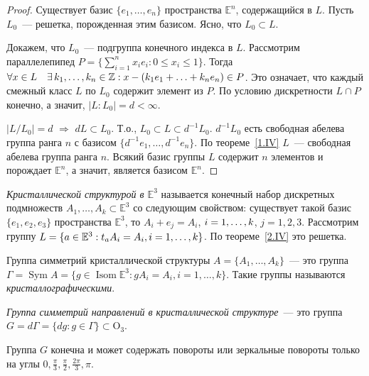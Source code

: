 \documentclass[a4paper]{article}
\renewcommand{\Isom}{\mathop{\mathrm{Isom}}\nolimits}
\newcommand{\Sym}{\mathop{\mathrm{Sym}}\nolimits}
\newcommand*{\p}[1]{#1\nobreak\discretionary{}{\hbox{$\mathsurround=0pt #1$}}{}}
\begin{document}
\begin{proof}
Существует базис $\{e_1,\ldots,e_n\}$ пространства $\mathbb{E}^n$,
содержащийся в $L$. Пусть $L_0$~--- решетка, порожденная этим
базисом. Ясно, что $L_0\subset L$.

Докажем, что $L_0$~--- подгруппа конечного индекса в $L$. Рассмотрим
параллелепипед $P=\Big\{\sum\limits_{i=1}^n x_ie_i: 0\leqslant
x_i\leqslant 1\Big\}$. Тогда $\forall x\in L\quad\exists \,
k_1,\ldots,k_n\p\in\mathbb{Z}: x-(k_1e_1+\ldots+k_ne_n)\in P$. Это
означает, что каждый смежный класс $L$ по $L_0$ содержит элемент из
$P$. По условию дискретности $L\cap P$ конечно, а значит,
$|L:L_0|=d<\infty$.

$|L/L_0|=d$ $\Rightarrow$ $dL\subset L_0$. Т.о., $L_0\subset
L\subset d^{-1}L_0$. $d^{-1}L_0$ есть свободная абелева группа ранга
$n$ с базисом $\{d^{-1}e_1,\ldots,d^{-1}e_n\}$. По
теореме~\ref{1.IV} $L$~--- свободная абелева группа ранга $n$.
Всякий базис группы $L$ содержит $n$ элементов и порождает
$\mathbb{E}^n$, а значит, является базисом $\mathbb{E}^n$.
\end{proof}

\emph{Кристаллической структурой в $\mathbb{E}^3$} называется
конечный набор дискретных подмножеств $A_1,\ldots,A_k\subset
\mathbb{E}^3$ со следующим свойством: существует такой базис
$\{e_1,e_2,e_3\}$ пространства $\mathbb{E}^3$, то $A_i+e_j=A_i$,
$i\p=1,\ldots,k$, $j=1,2,3$. Рассмотрим группу
$L=\{a\in\mathbb{E}^3: t_aA_i=A_i, i\p=1,\ldots,k\}$. По
теореме~\ref{2.IV} это решетка.

Группа симметрий кристаллической структуры
$A=\{A_1,\ldots,A_k\}$~--- это группа $\Gamma=\Sym A=\{g\in
\Isom\mathbb{E}^3: gA_i=A_i, i=1,\ldots,k\}$. Такие группы
называются \emph{кристаллографическими}.

\emph{Группа симметрий направлений в кристаллической структуре}~---
это группа $G=d\Gamma=\{dg:g\in\Gamma\}\subset \mathrm{O}_3$.

\begin{theorem}
Группа $G$ конечна и может содержать повороты или зеркальные
повороты только на углы
$0,\frac{\pi}{3},\frac{\pi}{2},\frac{2\pi}{3},\pi$.
\end{theorem}
\end{document}
